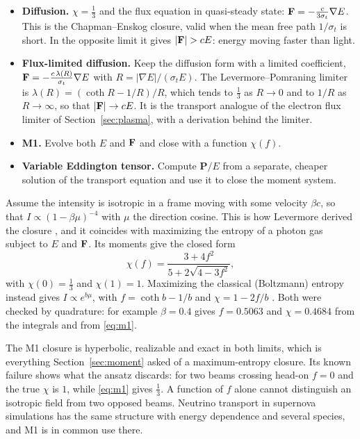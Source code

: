 \begin{itemize}
  \item \textbf{Diffusion.} $\chi=\tfrac13$ and the flux equation in
    quasi-steady state: $\mathbf{F}=-\tfrac{c}{3\sigma_t}\nabla E$. This is the
    Chapman--Enskog closure, valid when the mean free path $1/\sigma_t$ is
    short. In the opposite limit it gives $|\bF|>cE$: energy moving faster
    than light.
  \item \textbf{Flux-limited diffusion.} Keep the diffusion form with a
    limited coefficient,
    $\mathbf{F}=-\tfrac{c\,\lambda(R)}{\sigma_t}\nabla E$ with
    $R=|\nabla E|/(\sigma_tE)$. The Levermore--Pomraning limiter
    \cite{LevermorePomraning81} is
    $\lambda(R)=(\coth R-1/R)/R$, which tends to $\tfrac13$ as $R\to0$ and
    to $1/R$ as $R\to\infty$, so that $|\mathbf{F}|\to cE$. It is the transport
    analogue of the electron flux limiter of Section~\ref{sec:plasma}, with
    a derivation behind the limiter.
  \item \textbf{M1.} Evolve both $E$ and $\mathbf{F}$ and close with a function
    $\chi(f)$.
  \item \textbf{Variable Eddington tensor.} Compute
    $\mathbf P/E$ from a separate, cheaper solution of the transport
    equation and use it to close the moment system.
\end{itemize}

\begin{example}
\label{ex:m1}
Assume the intensity is isotropic in a frame moving with some velocity
$\beta c$, so that $I\propto(1-\beta\mu)^{-4}$ with $\mu$ the direction
cosine. This is how Levermore derived the closure \cite{Levermore84}, and
it coincides with maximizing the entropy of a photon gas subject to $E$
and $\mathbf{F}$. Its moments give the closed form
\begin{equation}
  \chi(f)=\frac{3+4f^2}{5+2\sqrt{4-3f^2}} ,
  \label{eq:m1}
\end{equation}
with $\chi(0)=\tfrac13$ and $\chi(1)=1$. Maximizing the classical
(Boltzmann) entropy instead gives $I\propto e^{b\mu}$, with
$f=\coth b-1/b$ and $\chi=1-2f/b$ \cite{Minerbo78}. Both were checked by
quadrature: for example $\beta=0.4$ gives $f=0.5063$ and $\chi=0.4684$
from the integrals and from \eqref{eq:m1}.
\end{example}

The M1 closure is hyperbolic, realizable and exact in both limits, which
is everything Section~\ref{sec:moment} asked of a maximum-entropy closure.
Its known failure shows what the ansatz discards: for two beams crossing
head-on $f=0$ and the true $\chi$ is $1$, while \eqref{eq:m1} gives
$\tfrac13$. A function of $f$ alone cannot distinguish an isotropic field
from two opposed beams. Neutrino transport in supernova simulations has the
same structure with energy dependence and several species, and M1 is in
common use there.

